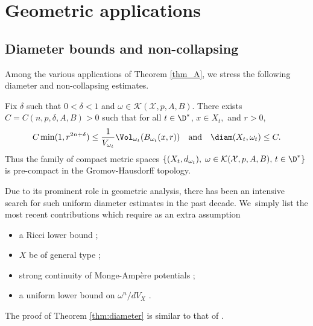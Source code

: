 \section{Geometric applications}

\subsection{Diameter bounds and non-collapsing}

Among the various applications of Theorem \ref{thm_A}, we stress the following diameter and non-collapsing estimates.

\begin{theorem} \label{thm:diameter}
Fix $\delta$ such that $0<\delta<1$ and $\omega \in {\mathcal K}(\mathcal{X},p,A,B)$.
There exists $C=C(n,p,\delta,A,B)>0$ such that for all $ t \in \D^*$, $x \in X_t, $ and $r>0$,
\[
C \min(1,r^{2n+\delta}) \leq \frac{1}{V_{\omega_t}} \Vol_{\omega_t}(B_{\omega_t}(x,r))
\quad \text{and} \quad
\diam(X_t,\omega_t) \leq C.
\]
Thus the family of compact metric spaces
$\{ (X_t,d_{\omega_t}), \; \omega \in {\mathcal K}(\mathcal{X},p,A,B), \, t \in \D^* \}$
is pre-compact in the Gromov-Hausdorff topology.
\end{theorem}

Due to its prominent role in geometric analysis, there has been an intensive search for such uniform diameter estimates in the past decade. We~simply list the most recent contributions which require as an extra assumption
\begin{itemize}
\item a Ricci lower bound \cite{LTZ17,FGS20,GS22};
\item $X$ be of general type \cite{Bam18,Wang18,JS22};
\item strong continuity of Monge-Ampère potentials \cite{Li21,GGZ23,V23};
\item a uniform lower bound on $\omega^n/dV_X$ \cite{GPS22,GPSS22,GPSS23}.
\end{itemize}

The proof of Theorem \ref{thm:diameter} is similar to that of \cite[Th.\,1.1]{GPSS22}.

